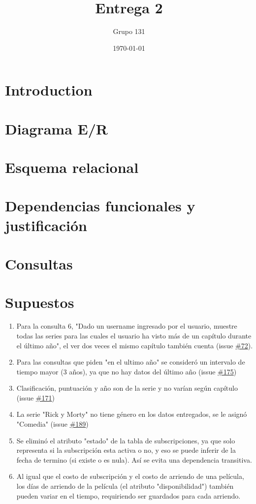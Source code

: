 \documentclass{article}
\title{Entrega 2}
\author{Grupo 131}
\date{\today}
\begin{document}
\maketitle

\section{Introduction}

\section{Diagrama E/R}

\section{Esquema relacional}

\section{Dependencias funcionales y justificación}

\section{Consultas}

\section{Supuestos}
\begin{enumerate}
    \item Para la consulta 6, "Dado un username ingresado por el usuario, muestre todas las series para las cuales el usuario ha visto más de un capítulo durante el último año", el ver dos veces el mismo capítulo también cuenta (issue \href{https://github.com/IIC2413/Syllabus-2023-2/issues/172}{\#72}).
    \item Para las consultas que piden "en el ultimo año" se consideró un intervalo de tiempo mayor (3 años), ya que no hay datos del último año (issue \href{https://github.com/IIC2413/Syllabus-2023-2/issues/175}{\#175})
    \item Clasificación, puntuación y año son de la serie y no varían según capítulo (issue \href{https://github.com/IIC2413/Syllabus-2023-2/issues/171}{\#171})
    \item La serie "Rick  y Morty" no tiene género en los datos entregados, se le asignó "Comedia" (issue \href{https://github.com/IIC2413/Syllabus-2023-2/issues/189}{\#189})
    \item Se eliminó el atributo "estado" de la tabla de subscripciones, ya que solo representa si la subscripción esta activa o no, y eso se puede inferir de la fecha de termino (si existe o es nula). Así se evita una dependencia transitiva.
    \item Al igual que el costo de subscripción y el costo de arriendo de una película, los días de arriendo de la película (el atributo "disponibilidad") también pueden variar en el tiempo, requiriendo ser guardados para cada arriendo.
\end{enumerate}
\end{document}
